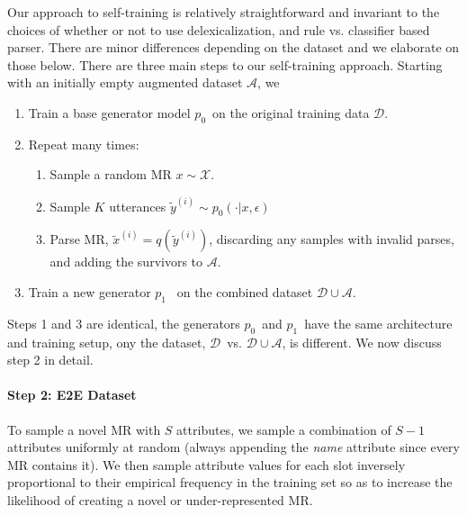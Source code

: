     \label{section:selftrain}

\newcommand{\trdata}{\ensuremath{\mathcal{D}}}
\newcommand{\augdata}{\ensuremath{\mathcal{A}}}
\newcommand{\basegen}{\ensuremath{p_0}}
\newcommand{\auggen}{\ensuremath{p_1}}
\newcommand{\sampley}{\ensuremath{\tilde{y}}}
\newcommand{\samplex}{\ensuremath{\tilde{x}}}
\newcommand{\clf}{\ensuremath{q}}
\newcommand{\ruleclf}{\ensuremath{q_r}}
\newcommand{\learnedclf}{\ensuremath{q_\phi}}

\newcommand{\descy}{\ensuremath{y}}

\newcommand{\mrx}{\ensuremath{x}}




Our approach to self-training is relatively straightforward and 
invariant
to the choices of whether or not to use delexicalization, and rule vs. 
classifier based
parser. There are minor differences depending on the dataset and we elaborate 
on
those below. There are three main steps to our self-training approach.
Starting with an initially empty augmented dataset \augdata, we 

\begin{enumerate}

    \item Train a base generator model \basegen~on the original training
        data \trdata.
    \item Repeat many times:
        \begin{enumerate}
            \item Sample a random MR $\mrx \sim \mathcal{X}$. 
            \item Sample $K$ utterances $\sampley^{(i)} \sim \basegen(\cdot|\mrx, \epsilon)$ 
            \item Parse MR, $\samplex^{(i)} = \clf(\sampley^{(i)})$,
            discarding any samples with invalid parses, and adding the 
            survivors to \augdata.
        \end{enumerate}
    \item Train a new generator \auggen~ on the combined dataset $\trdata \cup
       \augdata$.
\end{enumerate}
Steps 1 and 3 are identical, the generators \basegen~and \auggen~have the same 
architecture and training setup, ony the dataset, \trdata~vs. $\trdata \cup
\augdata$, is different. We now discuss step 2 in detail. 


\paragraph{Step 2: E2E Dataset} 
To sample a novel MR with  $S$ attributes, we sample a combination of $S-1$ attributes
uniformly at random %
(always appending the \textit{name} attribute since every MR contains it).
 We 
then sample attribute values for each slot %
inversely proportional to their empirical frequency
in the training set so as to increase the likelihood of creating a novel
or under-represented MR.


